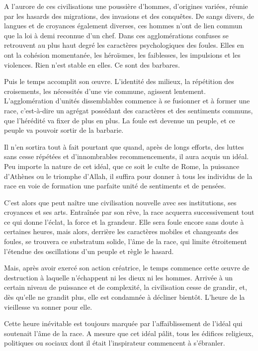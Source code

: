 \documentclass[french,twoside]{book} %
\begin{document}
A l’aurore de ces civilisations une poussière d’hommes, d’origines variées, réunie par les hasards des migrations, des invasions et des conquêtes. De sangs divers, de langues et de croyances également diverses, ces hommes n’ont de lien commun que la loi à demi reconnue d’un chef. Dans ces agglomérations confuses se retrouvent au plus haut degré les caractères psychologiques des foules. Elles en ont la cohésion momentanée, les héroïsmes, les faiblesses, les impulsions et les violences. Rien n’est stable en elles. Ce sont des barbares.\par
Puis le temps accomplit son œuvre. L’identité des milieux, la répétition des croisements, les nécessités d’une vie commune, agissent lentement. L’agglomération d’unités dissemblables commence à se fusionner et à former une race, c’est-à-dire un agrégat possédant des caractères et des sentiments communs, que l’hérédité va fixer de plus en plus. La foule est devenue un peuple, et ce peuple va pouvoir sortir de la barbarie.\par
Il n’en sortira tout à fait pourtant que quand, après de longs efforts, des luttes sans cesse répétées et d’innombrables recommencements, il aura acquis un idéal. Peu importe la nature de cet idéal, que ce soit le culte de Rome, la puissance d’Athènes ou le triomphe d’Allah, il suffira pour donner à tous les individus de la race en voie de formation une parfaite unité de sentiments et de pensées.\par
C’est alors que peut naître une civilisation nouvelle avec ses institutions, ses croyances et ses arts. Entraînée par son rêve, la race acquerra successivement tout ce qui donne l’éclat, la force et la grandeur. Elle sera foule encore sans doute à certaines heures, mais alors, derrière les caractères mobiles et changeants des foules, se trou­vera ce substratum solide, l’âme de la race, qui limite étroitement l’étendue des oscillations d’un peuple et règle le hasard.\par
Mais, après avoir exercé son action créatrice, le temps commence cette œuvre de destruction à laquelle n’échappent ni les dieux ni les hommes. Arrivée à un certain niveau de puissance et de complexité, la civilisation cesse de grandir, et, dès qu’elle ne grandit plus, elle est condamnée à décliner bientôt. L’heure de la vieillesse va sonner pour elle.\par
Cette heure inévitable est toujours marquée par l’affaiblissement de l’idéal qui soutenait l’âme de la race. A mesure que cet idéal pâlit, tous les édifices religieux, politiques ou sociaux dont il était l’inspirateur commencent à s’ébranler.\par
\end{document}
